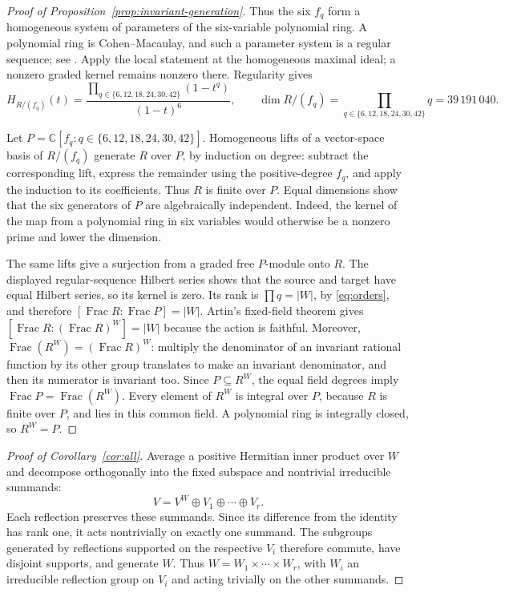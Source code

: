 \documentclass[11pt]{article}
\theoremstyle{definition}
\newcommand{\C}{\mathbb C}
\newcommand{\Frac}{\operatorname{Frac}}
\newcommand{\degrees}{\{6,12,18,24,30,42\}}
\begin{document}
\begin{appendices}
\begin{proof}[Proof of Proposition~\ref{prop:invariant-generation}]
Thus the six $f_q$ form a homogeneous system of parameters of the
six-variable polynomial ring. A polynomial ring is Cohen--Macaulay,
and such a parameter system is a regular sequence; see
\cite[Tags~00ND and~02JN]{Stacks}. Apply the local statement at
the homogeneous maximal ideal; a nonzero graded kernel remains
nonzero there. Regularity gives
\[
             H_{R/(f_q)}(t)=\frac{\prod_{q\in\degrees}(1-t^q)}{(1-t)^6},
           \qquad \dim R/(f_q)=\prod_{q\in\degrees}q=39\,191\,040.
\]

Let $P=\C[f_q:q\in\degrees]$. Homogeneous lifts of a vector-space
basis of $R/(f_q)$ generate $R$ over $P$, by induction on degree:
subtract the corresponding lift, express the remainder using the
positive-degree $f_q$, and apply the induction to its coefficients.
Thus $R$ is finite over $P$. Equal dimensions show that the six
generators of $P$ are algebraically independent. Indeed, the kernel
of the map from a polynomial ring in six variables would otherwise
be a nonzero prime and lower the dimension.

The same lifts give a surjection from a graded free $P$-module onto
$R$. The displayed regular-sequence Hilbert series shows that the
source and target have equal Hilbert series, so its kernel is zero.
Its rank is $\prod q=|W|$, by \eqref{eq:orders}, and therefore
$[\Frac R:\Frac P]=|W|$.
Artin's fixed-field theorem
\cite[Tag~09I3]{Stacks} gives
$[\Frac R:(\Frac R)^W]=|W|$ because the action is faithful.
Moreover, $\Frac(R^W)=(\Frac R)^W$: multiply the denominator of
an invariant rational function by its other group translates to make
an invariant denominator, and then its numerator is invariant too.
Since $P\subseteq R^W$, the equal field degrees imply
$\Frac P=\Frac(R^W)$.
Every element of $R^W$ is integral over $P$, because $R$ is finite
over $P$, and lies in this common field. A polynomial ring is
integrally closed, so $R^W=P$.
\end{proof}

\begin{proof}[Proof of Corollary~\ref{cor:all}]
Average a positive Hermitian inner product over $W$ and decompose
orthogonally into the fixed subspace and nontrivial irreducible summands:
\[
                    V=V^W\oplus V_1\oplus\cdots\oplus V_r.
\]
Each reflection preserves these summands. Since its difference from the
identity has rank one, it acts nontrivially on exactly one summand.
The subgroups generated by reflections supported on the respective
$V_i$ therefore commute, have disjoint supports, and generate $W$.
Thus $W=W_1\times\cdots\times W_r$, with $W_i$ an irreducible
reflection group on $V_i$ and acting trivially on the other summands.


\end{proof}
\end{appendices}
\end{document}
